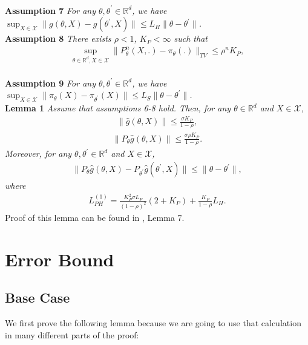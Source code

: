 \documentclass[a4paper]{article}
\newcommand{\norm}[1]{\|#1 \|}
\newcommand{\constLPH}[1]{L_{PH}^{(#1)}}
\begin{document}
	\\
	\textbf{Assumption 7} \textit{
		For any $\theta, \theta^{\prime} \in \mathbb{R}^{d}$, we have $\sup_{X \in \mathcal{X}}\norm{g\left(\theta, X\right) - g\left(\theta^{\prime}, X\right)} \le L_{H}\norm{\theta - \theta^{\prime}}$.
	}
	\\
	\textbf{Assumption 8} \textit{
		There exists $\rho < 1$, $K_{P} < \infty$ such that
		\begin{align*}
			\sup_{\theta \in \mathbb{R}^{d}, X \in \mathcal{X}} \norm{P_{\theta}^{n}\left(X, .\right) - \pi_{\theta}(.)}_{TV} \le \rho^{n}K_{P},
		\end{align*}
	}
	\\
	\textbf{Assumption 9} \textit{
		For any $\theta, \theta^{\prime} \in \mathbb{R}^{d}$, we have $\sup_{X \in \mathcal{X}}\norm{\pi_{\theta}(X) - \pi_{\theta^{\prime}}(X)} \le L_{S}\norm{\theta - \theta^{\prime}}$.
	}
	\\
	\textbf{Lemma 1} \textit{
		Assume that assumptions 6-8 hold. Then, for any $\theta \in \mathbb{R}^{d}$ and $X \in \mathcal{X}$,
		\begin{align*}
			\norm{\hat{g}\left(\theta, X\right)} \le \frac{\sigma K_{P}}{1 - \rho},
		\end{align*}
		\begin{align*}
			\norm{P_{\theta}\hat{g}\left(\theta, X\right)} \le \frac{\sigma \rho K_{P}}{1 - \rho}.
		\end{align*}
		Moreover, for any $\theta, \theta^{\prime} \in \mathbb{R}^{d}$ and $X \in \mathcal{X}$,
		\begin{align*}
			\norm{P_{\theta}\hat{g}\left(\theta, X\right) - P_{\theta^{\prime}}\hat{g}\left(\theta^{\prime}, X\right)} \le \norm{\theta - \theta^{\prime}},
		\end{align*}
		where
		\begin{align*}
			\constLPH{1} = \frac{K_{P}^{2}\sigma L_{P}}{(1 - \rho)^{2}}\left(2 + K_{P}\right) + \frac{K_{P}}{1 - \rho}L_{H}.
		\end{align*}
	}
	Proof of this lemma can be found in \cite{karimi2019non}, Lemma 7.
	\section{Error Bound}
	
	\subsection{Base Case}
	
	We first prove the following lemma because we are going to use that calculation in many different parts of the proof:
	
\end{document}
